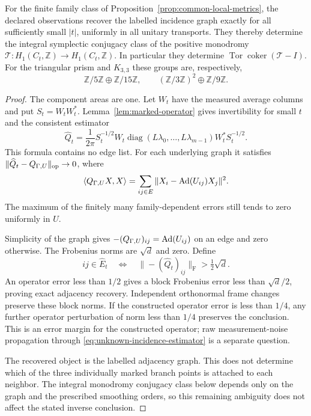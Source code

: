 \begin{theorem}\label{thm:monodromy-inverse}
For the finite family class of
Proposition~\ref{prop:common-local-metrics},
the declared observations recover
the labelled incidence graph exactly
for all sufficiently small $|t|$,
uniformly in all unitary transports.
They thereby determine the integral
symplectic conjugacy class of the
positive monodromy
$\mathcal T:H_1(C_t,\mathbb Z)\to H_1(C_t,\mathbb Z)$.
In particular they determine
$\operatorname{Tor}\operatorname{coker}(\mathcal T-I)$.
For the triangular prism and $K_{3,3}$
these groups are, respectively,
\[
 \mathbb Z/5\mathbb Z\oplus\mathbb Z/15\mathbb Z,
 \qquad
 (\mathbb Z/3\mathbb Z)^2\oplus\mathbb Z/9\mathbb Z .
\]
\end{theorem}
\begin{proof}
The component areas are one.
Let $W_t$ have the measured average
columns and put $S_t=W_tW_t^*$.
Lemma~\ref{lem:marked-operator} gives
invertibility for small $t$ and
the consistent estimator
\begin{equation}\label{eq:unknown-incidence-estimator}
 \widehat Q_t
 =\frac1{2\pi}S_t^{-1/2}W_t
     \operatorname{diag}(L\lambda_0,\ldots,L\lambda_{m-1})
                          W_t^*S_t^{-1/2}.
\end{equation}
This formula contains no edge list.
For each underlying graph it satisfies
$\|\widehat Q_t-Q_{\Gamma,U}\|_{\mathrm{op}}\to0$,
where
\[
 \langle Q_{\Gamma,U}X,X\rangle
       =\sum_{ij\in E}\|X_i-\operatorname{Ad}(U_{ij})X_j\|^2.
\]
The maximum of the finitely many
family-dependent errors still tends
to zero uniformly in $U$.

Simplicity of the graph gives
$-(Q_{\Gamma,U})_{ij}=\operatorname{Ad}(U_{ij})$
on an edge and zero otherwise.
The Frobenius norms are $\sqrt d$
and zero. Define
\[
 ij\in\widehat E_t
 \quad\Longleftrightarrow\quad
 \|-(\widehat Q_t)_{ij}\|_{\mathrm F}
                                      >\tfrac12\sqrt d .
\]
An operator error less than $1/2$
gives a block Frobenius error less
than $\sqrt d/2$, proving exact
adjacency recovery. Independent
orthonormal frame changes preserve
these block norms. If the constructed
operator error is less than $1/4$,
any further operator perturbation
of norm less than $1/4$ preserves
the conclusion. This is an error
margin for the constructed operator;
raw measurement-noise propagation
through \eqref{eq:unknown-incidence-estimator}
is a separate question.

The recovered object is the labelled adjacency
graph. This does not determine which of the
three individually marked branch points is
attached to each neighbor. The integral
monodromy conjugacy class below depends only
on the graph and the prescribed smoothing
orders, so this remaining ambiguity does not
affect the stated inverse conclusion.


\end{proof}
